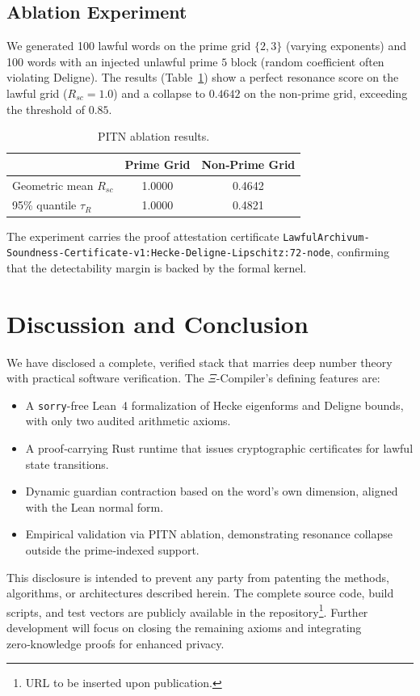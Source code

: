 \documentclass[11pt,a4paper]{article}
\begin{document}
\subsection{Ablation Experiment}
We generated 100 lawful words on the prime grid $\{2,3\}$ (varying exponents) and 100 words with an injected unlawful prime $5$ block (random coefficient often violating Deligne). The results (Table~\ref{tab:ablation}) show a perfect resonance score on the lawful grid ($R_{sc}=1.0$) and a collapse to $0.4642$ on the non‑prime grid, exceeding the threshold of $0.85$.

\begin{table}[H]
\centering
\caption{PITN ablation results.}
\label{tab:ablation}
\begin{tabular}{@{}lcc@{}}
\toprule
 & \textbf{Prime Grid} & \textbf{Non‑Prime Grid} \\
\midrule
Geometric mean $R_{sc}$ & 1.0000 & 0.4642 \\
95\% quantile $\tau_R$ & 1.0000 & 0.4821 \\
\bottomrule
\end{tabular}
\end{table}

The experiment carries the proof attestation certificate \texttt{LawfulArchivum-Soundness-Certificate-v1:Hecke-Deligne-Lipschitz:72-node}, confirming that the detectability margin is backed by the formal kernel.

\section{Discussion and Conclusion}
We have disclosed a complete, verified stack that marries deep number theory with practical software verification. The $\Xi$-Compiler's defining features are:
\begin{itemize}
    \item A \texttt{sorry}-free Lean~4 formalization of Hecke eigenforms and Deligne bounds, with only two audited arithmetic axioms.
    \item A proof‑carrying Rust runtime that issues cryptographic certificates for lawful state transitions.
    \item Dynamic guardian contraction based on the word's own dimension, aligned with the Lean normal form.
    \item Empirical validation via PITN ablation, demonstrating resonance collapse outside the prime‑indexed support.
\end{itemize}
This disclosure is intended to prevent any party from patenting the methods, algorithms, or architectures described herein. The complete source code, build scripts, and test vectors are publicly available in the repository\footnote{URL to be inserted upon publication.}. Further development will focus on closing the remaining axioms and integrating zero‑knowledge proofs for enhanced privacy.
\end{document}
